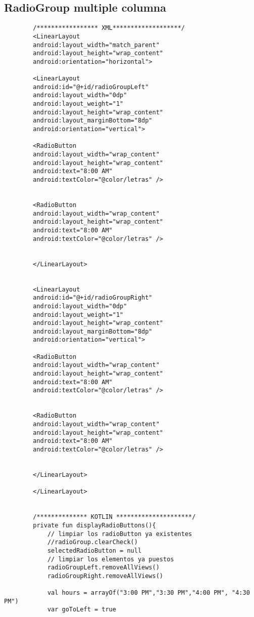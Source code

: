 \documentclass[a4paper]{article}
\begin{document}
	\subsection{RadioGroup multiple columna}
	
	
	\begin{lstlisting}
		/***************** XML*******************/
		<LinearLayout
		android:layout_width="match_parent"
		android:layout_height="wrap_content"
		android:orientation="horizontal">
		
		<LinearLayout
		android:id="@+id/radioGroupLeft"
		android:layout_width="0dp"
		android:layout_weight="1"
		android:layout_height="wrap_content"
		android:layout_marginBottom="8dp"
		android:orientation="vertical">
		
		<RadioButton
		android:layout_width="wrap_content"
		android:layout_height="wrap_content"
		android:text="8:00 AM"
		android:textColor="@color/letras" />
		
		
		<RadioButton
		android:layout_width="wrap_content"
		android:layout_height="wrap_content"
		android:text="8:00 AM"
		android:textColor="@color/letras" />
		
		
		</LinearLayout>
		
		
		<LinearLayout
		android:id="@+id/radioGroupRight"
		android:layout_width="0dp"
		android:layout_weight="1"
		android:layout_height="wrap_content"
		android:layout_marginBottom="8dp"
		android:orientation="vertical">
		
		<RadioButton
		android:layout_width="wrap_content"
		android:layout_height="wrap_content"
		android:text="8:00 AM"
		android:textColor="@color/letras" />
		
		
		<RadioButton
		android:layout_width="wrap_content"
		android:layout_height="wrap_content"
		android:text="8:00 AM"
		android:textColor="@color/letras" />
		
		
		</LinearLayout>
		
		</LinearLayout>
		
		
		/************** KOTLIN *********************/
		private fun displayRadioButtons(){
			// limpiar los radioButton ya existentes
			//radioGroup.clearCheck()
			selectedRadioButton = null
			// limpiar los elementos ya puestos
			radioGroupLeft.removeAllViews()
			radioGroupRight.removeAllViews()
			
			val hours = arrayOf("3:00 PM","3:30 PM","4:00 PM", "4:30 PM")
			var goToLeft = true
			

\end{lstlisting}
\end{document}

